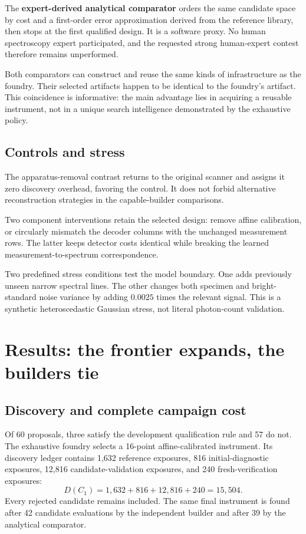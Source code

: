 \documentclass[11pt,a4paper]{article}
\newcommand{\COne}{\ensuremath{C_1}}
\begin{document}
The \textbf{expert-derived analytical comparator} orders the same candidate space by cost and a first-order error approximation derived from the reference library, then stops at the first qualified design. It is a software proxy. No human spectroscopy expert participated, and the requested strong human-expert contest therefore remains unperformed.

Both comparators can construct and reuse the same kinds of infrastructure as the foundry. Their selected artifacts happen to be identical to the foundry's artifact. This coincidence is informative: the main advantage lies in acquiring a reusable instrument, not in a unique search intelligence demonstrated by the exhaustive policy.

\subsection{Controls and stress}

The apparatus-removal contrast returns to the original scanner and assigns it zero discovery overhead, favoring the control. It does not forbid alternative reconstruction strategies in the capable-builder comparisons.

Two component interventions retain the selected design: remove affine calibration, or circularly mismatch the decoder columns with the unchanged measurement rows. The latter keeps detector costs identical while breaking the learned measurement-to-spectrum correspondence.

Two predefined stress conditions test the model boundary. One adds previously unseen narrow spectral lines. The other changes both specimen and bright-standard noise variance by adding \(0.0025\) times the relevant signal. This is a synthetic heteroscedastic Gaussian stress, not literal photon-count validation.

\section{Results: the frontier expands, the builders tie}

\subsection{Discovery and complete campaign cost}

Of 60 proposals, three satisfy the development qualification rule and 57 do not. The exhaustive foundry selects a 16-point affine-calibrated instrument. Its discovery ledger contains 1,632 reference exposures, 816 initial-diagnostic exposures, 12,816 candidate-validation exposures, and 240 fresh-verification exposures:
\[
D(\COne)=1{,}632+816+12{,}816+240=15{,}504.
\]
Every rejected candidate remains included. The same final instrument is found after 42 candidate evaluations by the independent builder and after 39 by the analytical comparator.
\end{document}
